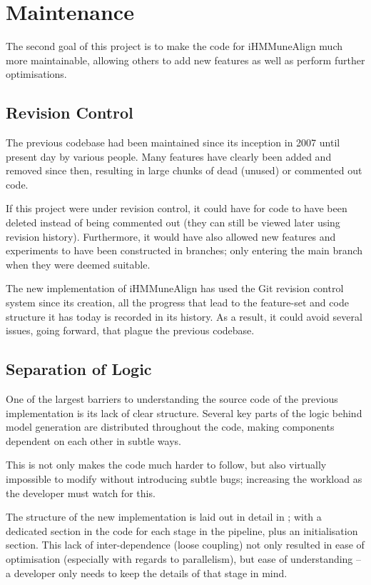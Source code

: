 \leavevmode
\section{Maintenance}
The second goal of this project is to make the code for iHMMuneAlign much more maintainable, allowing others to add new features as well as perform further optimisations.


\subsection{Revision Control}
The previous codebase had been maintained since its inception in 2007 until present day by various people. Many features have clearly been added and removed since then, resulting in large chunks of dead (unused) or commented out code.

If this project were under revision control, it could have for code to have been deleted instead of being commented out (they can still be viewed later using revision history). Furthermore, it would have also allowed new features and experiments to have been constructed in branches; only entering the main branch when they were deemed suitable.

The new implementation of iHMMuneAlign has used the Git revision control system since its creation, all the progress that lead to the feature-set and code structure it has today is recorded in its history. As a result, it could avoid several issues, going forward, that plague the previous codebase.

\leavevmode
\subsection{Separation of Logic}
One of the largest barriers to understanding the source code of the previous implementation is its lack of clear structure. Several key parts of the logic behind model generation are distributed throughout the code, making components dependent on each other in subtle ways. 

This is not only makes the code much harder to follow, but also virtually impossible to modify without introducing subtle bugs; increasing the workload as the developer must watch for this.

The structure of the new implementation is laid out in detail in ; with a dedicated section in the code for each stage in the pipeline, plus an initialisation section. This lack of inter-dependence (loose coupling) not only resulted in ease of optimisation (especially with regards to parallelism), but ease of understanding -- a developer only needs to keep the details of that stage in mind.
	
